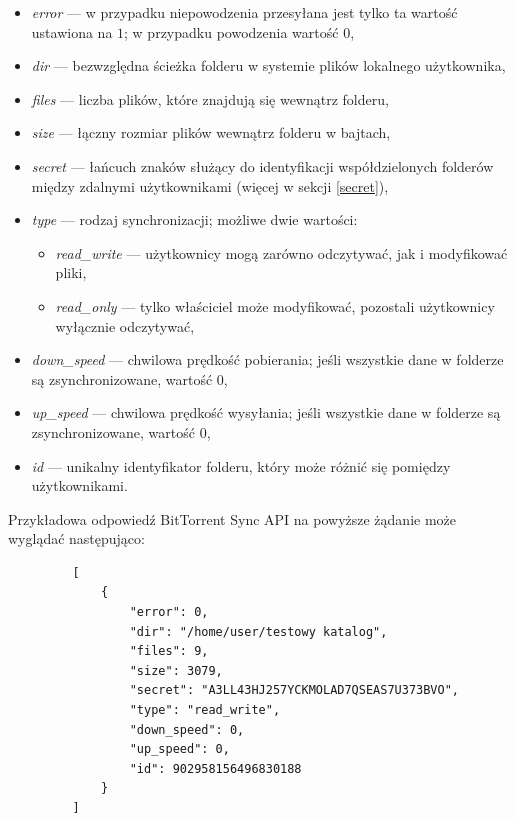 \documentclass[polish,a4paper,twoside]{ppfcmthesis}
\begin{document}
\begin{itemize}[noitemsep]
  \item \emph{error} --- w przypadku niepowodzenia przesyłana jest tylko ta wartość ustawiona na $1$; w przypadku powodzenia wartość $0$,
  
  \item \emph{dir} --- bezwzględna ścieżka folderu w systemie plików lokalnego użytkownika,
  
  \item \emph{files} --- liczba plików, które znajdują się wewnątrz folderu,
  
  \item \emph{size} --- łączny rozmiar plików wewnątrz folderu w bajtach,
  
  \item \emph{secret} --- łańcuch znaków służący do identyfikacji współdzielonych folderów między zdalnymi użytkownikami (więcej w sekcji \ref{secret}),
  
  \item \emph{type} --- rodzaj synchronizacji; możliwe dwie wartości:
  \begin{itemize}[noitemsep]
    \item \emph{read\_write} --- użytkownicy mogą zarówno odczytywać, jak i modyfikować pliki,
    
    \item \emph{read\_only} --- tylko właściciel może modyfikować, pozostali użytkownicy wyłącznie odczytywać,
  \end{itemize}
  
  \item \emph{down\_speed} --- chwilowa prędkość pobierania; jeśli wszystkie dane w folderze są zsynchronizowane, wartość $0$,
  
  \item \emph{up\_speed} --- chwilowa prędkość wysyłania; jeśli wszystkie dane w folderze są zsynchronizowane, wartość $0$,
  
  \item \emph{id} --- unikalny identyfikator folderu, który może różnić się pomiędzy użytkownikami.
\end{itemize}

Przykładowa odpowiedź BitTorrent Sync API na powyższe żądanie może wyglądać następująco:

\begin{minipage}{\linewidth}
\vspace{15pt}
\begin{verbatim}
         [
             {
                 "error": 0, 
                 "dir": "/home/user/testowy katalog", 
                 "files": 9, 
                 "size": 3079, 
                 "secret": "A3LL43HJ257YCKMOLAD7QSEAS7U373BVO", 
                 "type": "read_write", 
                 "down_speed": 0, 
                 "up_speed": 0, 
                 "id": 902958156496830188
             }
         ]
\end{verbatim}
\vspace{15pt}
\end{minipage}
\end{document}
